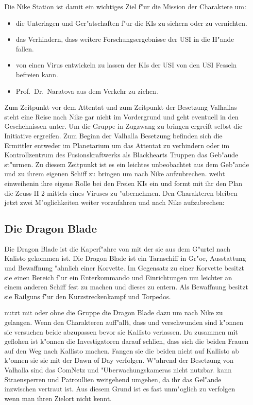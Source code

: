 Die Nike Station ist damit ein wichtiges Ziel f"ur die Mission der Charaktere um:

\begin{itemize}
	\item die Unterlagen und Ger"atschaften f"ur die KIs zu sichern oder zu vernichten.
	\item das Verhindern, dass weitere Forschungsergebnisse der USI in die H"ande fallen.
	\item von \ml{} einen Virus entwickeln zu lassen der KIs der USI von den USI Fesseln befreien kann.
	\item Prof.~Dr.~Naratova aus dem Verkehr zu ziehen.
\end{itemize}

Zum Zeitpunkt vor dem Attentat und zum Zeitpunkt der Besetzung Valhallas steht eine Reise nach Nike gar nicht im Vordergrund und geht eventuell in den Geschehnissen unter. Um die Gruppe in Zugzwang zu bringen ergreift \xl{} selbst die Initiative ergreifen. Zum Beginn der Valhalla Besetzung befinden sich die Ermittler entweder im Planetarium um das Attentat zu verhindern oder im Kontrollzentrum des Fusionskraftwerks als Blackhearts Truppen das Geb"aude st"urmen. Zu diesem Zeitpunkt ist es \xl{} ein leichtes \ml{} unbeobachtet aus dem Geb"aude und zu ihrem eigenen Schiff zu bringen um nach Nike aufzubrechen. \xl{} weiht \ml{} einweihenin ihre eigene Rolle bei den Freien KIs ein und formt mit ihr den Plan die Zeuss II-2 mittels eines Viruses zu "ubernehmen. Den Charakteren bleiben jetzt zwei M"oglichkeiten
weiter vorzufahren und nach Nike aufzubrechen:

\subsection{Die Dragon Blade}

Die Dragon Blade ist die Kaperf"ahre von \xl{} mit der sie aus dem G"urtel nach Kalisto gekommen ist. Die Dragon Blade 
ist ein Tarnschiff in Gr"o\3e, Ausstattung und Bewaffnung "ahnlich einer Korvette. Im Gegensatz zu einer Korvette 
besitzt sie einen Bereich f"ur ein Enterkommando und Einrichtungen um leichter an einem anderen Schiff fest zu machen 
und dieses zu entern. Als Bewaffnung besitzt sie Railguns f"ur den Kurzstreckenkampf und Torpedos.

\xl{} nutzt mit oder ohne die Gruppe die Dragon Blade dazu um nach Nike zu gelangen. Wenn den Charakteren auff"allt, dass \ml{} und \xl{} verschwunden sind k"onnen sie versuchen beide abzupassen bevor sie Kallisto verlassen. Da \xl{} zusammen mit \ml{} geflohen ist k"onnen die Investigatoren darauf schli\3en, dass sich die beiden Frauen auf den Weg nach Kallisto machen. Fangen sie die beiden nicht auf Kallisto ab k"onnen sie sie mit der Dawn of Day verfolgen. W"ahrend der Besetzung von Valhalla sind das ComNetz und "Uberwachungskameras nicht nutzbar. \xl{} kann Stra\3ensperren und Patroullien weitgehend umgehen, da ihr das Gel"ande inzwischen vertraut ist. Aus diesem Grund ist es fast unm"oglich \xl{} zu verfolgen wenn man ihren Zielort nicht kennt. 

